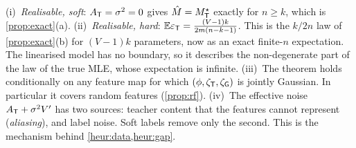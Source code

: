 \begin{remark}\label{rem:curve}
(i)~\emph{Realisable, soft}: $A_{\mathsf{T}}=\sigma^2=0$ gives $\hat M=M^\star_{\mathsf{T}}$ exactly for $n\ge k$, which is \cref{prop:exact}(a).
(ii)~\emph{Realisable, hard}: $\mathbb{E}\varepsilon_{\mathsf{T}}=\frac{(V-1)k}{2m(n-k-1)}$. This is the $k/2n$ law of \cref{prop:exact}(b) for
$(V-1)k$ parameters, now as an exact finite-$n$ expectation. The linearised model has no
boundary, so it describes the non-degenerate part of the law of the true MLE, whose expectation is
infinite.
(iii)~The theorem holds conditionally on any feature map for which $(\phi,\zeta_{\mathsf{T}},\zeta_{\mathsf G})$ is jointly Gaussian. In
particular it covers random features (\cref{prop:rf}).
(iv)~The effective noise $A_{\mathsf{T}}+\sigma^2V'$ has two sources: teacher content that the features cannot
represent (\emph{aliasing}), and label noise. Soft labels remove only the second. This is the mechanism
behind \cref{heur:data,heur:gap}.
\end{remark}

